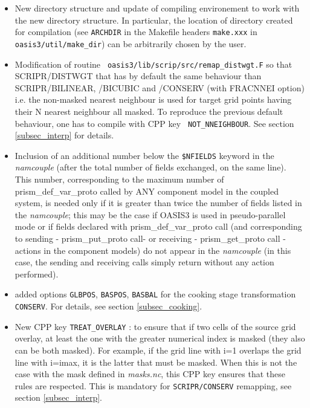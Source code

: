 \begin{itemize}
\begin{itemize}
  \item New directory structure and update of compiling environement
    to work with the new directory structure. In particular, the
    location of directory created for compilation (see {\tt ARCHDIR}
    in the Makefile headers {\tt make.xxx} in {\tt
      oasis3/util/make\_dir}) can be arbitrarily chosen by the user.

  \item Modification of routine {\tt
      oasis3/lib/scrip/src/remap\_distwgt.F} so that \newline SCRIPR/DISTWGT
    that has by default the same behaviour than SCRIPR/BILINEAR,
    /BICUBIC and /CONSERV (with FRACNNEI option) i.e. the non-masked
    nearest neighbour is used for target grid points having their N
    nearest neighbour all masked. To reproduce the previous default
    behaviour, one has to compile with CPP key {\tt
      NOT\_NNEIGHBOUR}. See section \ref{subsec_interp} for details.

  \item Inclusion of an additional number below the {\tt \$NFIELDS}
    keyword in the {\it namcouple} (after the total number of fields
    exchanged, on the same line). This number, corresponding to the
    maximum number of prism\_def\_var\_proto called by ANY component
    model in the coupled system, is needed only if it is greater than
    twice the number of fields listed in the {\it namcouple}; this may
    be the case if OASIS3 is used in pseudo-parallel mode or if fields
    declared with prism\_def\_var\_proto call (and corresponding to
    sending - prism\_put\_proto call- or receiving - prism\_get\_proto
    call - actions in the component models) do not appear in the 
    {\it namcouple} (in this case, the sending and receiving calls simply
    return without any action performed).

   \item added options {\tt GLBPOS}, {\tt BASPOS}, {\tt BASBAL} for the 
  cooking stage transformation {\tt CONSERV}. For details, see section
      \ref{subsec_cooking}.
  
   \item New CPP key {\tt TREAT\_OVERLAY} : to ensure that if two cells
    of the source grid overlay, at least the one with the greater
    numerical index is masked (they also can be both masked).  For
    example, if the grid line with i=1 overlaps the grid line with
    i=imax, it is the latter that must be masked. When this
    is not the case with the mask defined in {\it masks.nc}, this CPP key 
    ensures that these rules are respected. This is mandatory
    for {\tt SCRIPR/CONSERV} remapping, see section \ref{subsec_interp}.


\end{itemize}
\end{itemize}
